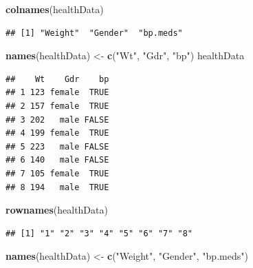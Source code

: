 \documentclass[
]{krantz}
\newenvironment{Shaded}{\begin{snugshade}}{\end{snugshade}}
\newcommand{\KeywordTok}[1]{\textcolor[rgb]{0.13,0.29,0.53}{\textbf{#1}}}
\newcommand{\NormalTok}[1]{#1}
\newcommand{\StringTok}[1]{\textcolor[rgb]{0.31,0.60,0.02}{#1}}
\begin{document}
\begin{Shaded}
\begin{Highlighting}[]
\KeywordTok{colnames}\NormalTok{(healthData)}
\end{Highlighting}
\end{Shaded}

\begin{verbatim}
## [1] "Weight"  "Gender"  "bp.meds"
\end{verbatim}

\begin{Shaded}
\begin{Highlighting}[]
\KeywordTok{names}\NormalTok{(healthData) \textless{}{-}}\StringTok{ }\KeywordTok{c}\NormalTok{(}\StringTok{"Wt"}\NormalTok{, }\StringTok{"Gdr"}\NormalTok{, }\StringTok{"bp"}\NormalTok{)}
\NormalTok{healthData}
\end{Highlighting}
\end{Shaded}

\begin{verbatim}
##    Wt    Gdr    bp
## 1 123 female  TRUE
## 2 157 female  TRUE
## 3 202   male FALSE
## 4 199 female  TRUE
## 5 223   male FALSE
## 6 140   male FALSE
## 7 105 female  TRUE
## 8 194   male  TRUE
\end{verbatim}

\begin{Shaded}
\begin{Highlighting}[]
\KeywordTok{rownames}\NormalTok{(healthData)}
\end{Highlighting}
\end{Shaded}

\begin{verbatim}
## [1] "1" "2" "3" "4" "5" "6" "7" "8"
\end{verbatim}

\begin{Shaded}
\begin{Highlighting}[]
\KeywordTok{names}\NormalTok{(healthData) \textless{}{-}}\StringTok{ }\KeywordTok{c}\NormalTok{(}\StringTok{"Weight"}\NormalTok{, }\StringTok{"Gender"}\NormalTok{, }\StringTok{"bp.meds"}\NormalTok{)}
\end{Highlighting}
\end{Shaded}
\end{document}
